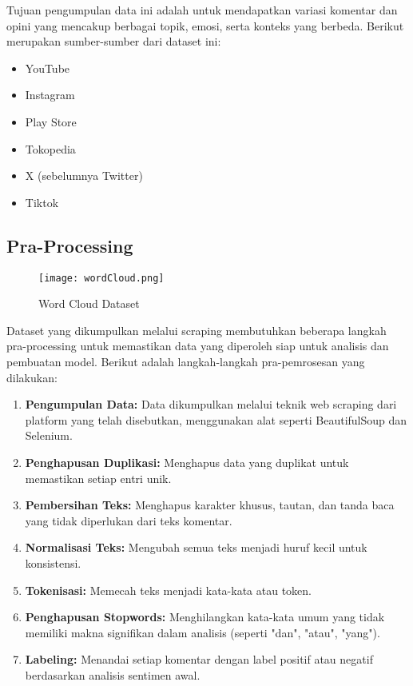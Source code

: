 \documentclass[12pt,a4paper]{article}
\begin{document}
Tujuan pengumpulan data ini adalah untuk mendapatkan variasi komentar dan opini yang mencakup berbagai topik, emosi, serta konteks yang berbeda. Berikut merupakan sumber-sumber dari dataset ini:

\begin{itemize}
    \item YouTube
    \item Instagram
    \item Play Store
    \item Tokopedia
    \item X (sebelumnya Twitter)
    \item Tiktok
\end{itemize}

\subsection{Pra-Processing}

\begin{figure}[h!]
    \centering
    \texttt{[image: wordCloud.png]}
    \caption{Word Cloud Dataset}
    \label{fig:result}
\end{figure}

Dataset yang dikumpulkan melalui scraping membutuhkan beberapa langkah pra-processing untuk memastikan data yang diperoleh siap untuk analisis dan pembuatan model. Berikut adalah langkah-langkah pra-pemrosesan yang dilakukan:

\begin{enumerate}
    \item \textbf{Pengumpulan Data:} Data dikumpulkan melalui teknik web scraping dari platform yang telah disebutkan, menggunakan alat seperti BeautifulSoup dan Selenium.
    \item \textbf{Penghapusan Duplikasi:} Menghapus data yang duplikat untuk memastikan setiap entri unik.
    \item \textbf{Pembersihan Teks:} Menghapus karakter khusus, tautan, dan tanda baca yang tidak diperlukan dari teks komentar.
    \item \textbf{Normalisasi Teks:} Mengubah semua teks menjadi huruf kecil untuk konsistensi.
    \item \textbf{Tokenisasi:} Memecah teks menjadi kata-kata atau token.
    \item \textbf{Penghapusan Stopwords:} Menghilangkan kata-kata umum yang tidak memiliki makna signifikan dalam analisis (seperti "dan", "atau", "yang").
    \item \textbf{Labeling:} Menandai setiap komentar dengan label positif atau negatif berdasarkan analisis sentimen awal.
\end{enumerate}
\end{document}
